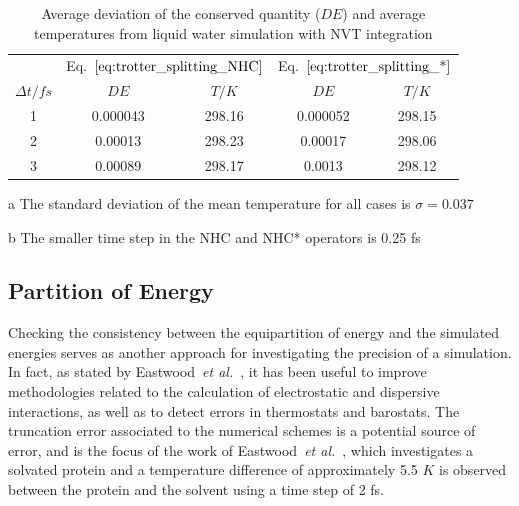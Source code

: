 \documentclass[aip,jcp,reprint,amsmath,amssymb,raggedbottom]{revtex4-1}
\begin{document}
\begin{table}[h]
\setlength{\tabcolsep}{7pt}
\begin{threeparttable}
\caption{Average deviation of the conserved quantity ($DE$) and average temperatures from liquid water simulation with NVT integration } 
\label{table:denvt}

\centering %
\begin{tabular}{|c c c c c |}  
\hline
& \multicolumn{2}{c}{Eq.~$\ref{eq:trotter_splitting_NHC}$} &\multicolumn{2}{c|}{Eq.~$\ref{eq:trotter_splitting_*}$} \\
\cline{2-5}
$\Delta t/fs$ &$D E$ &$T/K$ &$D E$ &$T/K$\\
\hline %
 1  & 0.000043 & 298.16  & 0.000052  & 298.15 \\

 2  & 0.00013 & 298.23  & 0.00017 & 298.06  \\

 3  & 0.00089 & 298.17  & 0.0013 & 298.12  \\

 \hline
\end{tabular}
\begin{tablenotes}
\item[a] The standard deviation of the mean temperature for all cases is $\sigma = 0.037$
\item[b] The smaller time step in the NHC and NHC* operators is 0.25 fs 
\end{tablenotes}
\end{threeparttable}
\end{table}

\subsection{Partition of Energy}
\label{sec:energypartition}

Checking the consistency between the equipartition of energy and the simulated energies serves as another approach for investigating the precision of a simulation. In fact, as stated by Eastwood~\textit{et al.}~\cite{Eastwood_2010}, it has been useful to improve methodologies related to the calculation of electrostatic\cite{Levitt_1988,Guenot_1992,Arnold_1994} and dispersive\cite{Sagui_1999} interactions, as well as to detect errors in thermostats\cite{Harvey_1998,Mor_2008} and barostats\cite{Feller_1995}. The truncation error associated to the numerical schemes is a potential source of error, and is the focus of the work of Eastwood~\textit{et al.}~\cite{Eastwood_2010}, which investigates a solvated protein and a temperature difference of approximately 5.5 $K$ is observed between the protein and the solvent using a time step of 2 fs.
\end{document}

